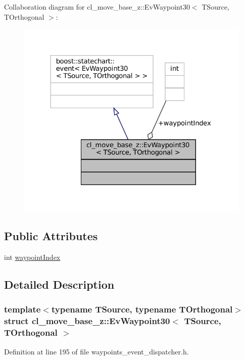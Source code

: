 Collaboration diagram for cl\+\_\+move\+\_\+base\+\_\+z\+:\+:Ev\+Waypoint30$<$ T\+Source, T\+Orthogonal $>$\+:
\nopagebreak
\begin{figure}[H]
\begin{center}
\leavevmode
\includegraphics[width=324pt]{structcl__move__base__z_1_1EvWaypoint30__coll__graph}
\end{center}
\end{figure}
\subsection*{Public Attributes}
\begin{DoxyCompactItemize}
\item 
int \hyperlink{structcl__move__base__z_1_1EvWaypoint30_aaa90bce1d5c685e8caa4aa09bfef9ef5}{waypoint\+Index}
\end{DoxyCompactItemize}


\subsection{Detailed Description}
\subsubsection*{template$<$typename T\+Source, typename T\+Orthogonal$>$\newline
struct cl\+\_\+move\+\_\+base\+\_\+z\+::\+Ev\+Waypoint30$<$ T\+Source, T\+Orthogonal $>$}



Definition at line 195 of file waypoints\+\_\+event\+\_\+dispatcher.\+h.



